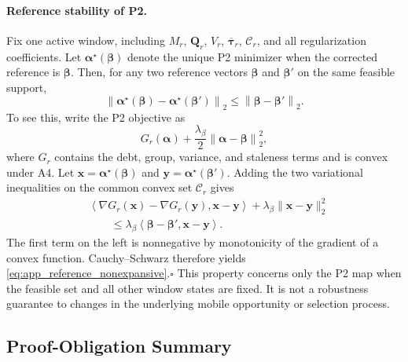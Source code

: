 \paragraph{Reference stability of P2.}
Fix one active window, including $M_r$, $\mathbf Q_r$, $V_r$,
$\overline{\boldsymbol\tau}_r$, $\mathcal C_r$, and all regularization
coefficients.  Let $\boldsymbol\alpha^\star(\boldsymbol\beta)$ denote the
unique P2 minimizer when the corrected reference is
$\boldsymbol\beta$.  Then, for any two reference vectors
$\boldsymbol\beta$ and $\boldsymbol\beta'$ on the same feasible support,
\begin{equation}
 \left\|
 \boldsymbol\alpha^\star(\boldsymbol\beta)
 -
 \boldsymbol\alpha^\star(\boldsymbol\beta')
 \right\|_2
 \le
 \left\|
 \boldsymbol\beta-\boldsymbol\beta'
 \right\|_2.
 \label{eq:app_reference_nonexpansive}
\end{equation}
To see this, write the P2 objective as
\begin{equation}
 G_r(\boldsymbol\alpha)
 +\frac{\lambda_\beta}{2}
 \left\|
 \boldsymbol\alpha-\boldsymbol\beta
 \right\|_2^2,
 \label{eq:app_p2_split}
\end{equation}
where $G_r$ contains the debt, group, variance, and staleness terms and is
convex under A4.  Let
$\mathbf x=\boldsymbol\alpha^\star(\boldsymbol\beta)$ and
$\mathbf y=\boldsymbol\alpha^\star(\boldsymbol\beta')$.  Adding the two
variational inequalities on the common convex set $\mathcal C_r$ gives
\begin{align}
 &\left\langle
 \nabla G_r(\mathbf x)-\nabla G_r(\mathbf y),
 \mathbf x-\mathbf y
 \right\rangle
 +\lambda_\beta\|\mathbf x-\mathbf y\|_2^2
 \nonumber\\
 &\qquad\le
 \lambda_\beta
 \left\langle
 \boldsymbol\beta-\boldsymbol\beta',
 \mathbf x-\mathbf y
 \right\rangle.
 \label{eq:app_reference_vi}
\end{align}
The first term on the left is nonnegative by monotonicity of the gradient of a
convex function.  Cauchy--Schwarz therefore yields
\eqref{eq:app_reference_nonexpansive}.\hfill$\square$  This property concerns only the P2 map
when the feasible set and all other window states are fixed.  It is not a
robustness guarantee to changes in the underlying mobile opportunity or
selection process.

\subsection{Proof-Obligation Summary}
\label{app:proof_summary}

